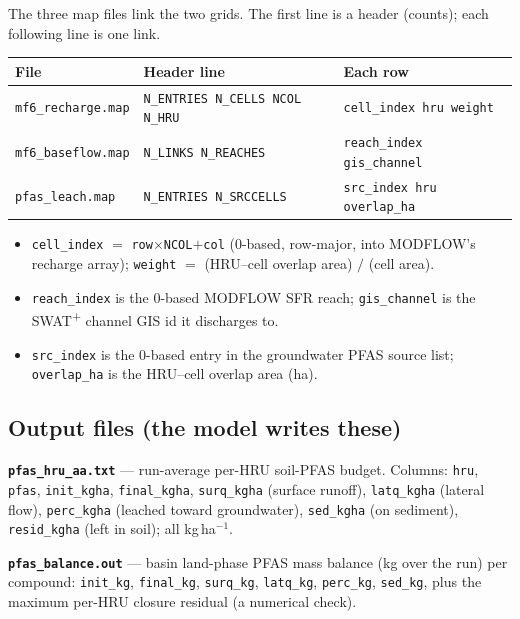 \documentclass[12pt]{article}
\begin{document}
The three map files link the two grids. The first line is a header (counts); each
following line is one link.
\begin{table}[ht]\centering\small
\begin{tabularx}{\textwidth}{lll}
\toprule
File & Header line & Each row \\ \midrule
\texttt{mf6\_recharge.map} & \texttt{N\_ENTRIES N\_CELLS NCOL N\_HRU} & \texttt{cell\_index hru weight} \\
\texttt{mf6\_baseflow.map} & \texttt{N\_LINKS N\_REACHES} & \texttt{reach\_index gis\_channel} \\
\texttt{pfas\_leach.map} & \texttt{N\_ENTRIES N\_SRCCELLS} & \texttt{src\_index hru overlap\_ha} \\
\bottomrule
\end{tabularx}
\end{table}
\begin{itemize}\itemsep1pt
  \item \texttt{cell\_index} $=$ \texttt{row}$\times$\texttt{NCOL}$+$\texttt{col}
        (0-based, row-major, into MODFLOW's recharge array); \texttt{weight} $=$
        (HRU--cell overlap area) $/$ (cell area).
  \item \texttt{reach\_index} is the 0-based MODFLOW SFR reach; \texttt{gis\_channel}
        is the SWAT\textsuperscript{+} channel GIS id it discharges to.
  \item \texttt{src\_index} is the 0-based entry in the groundwater PFAS source
        list; \texttt{overlap\_ha} is the HRU--cell overlap area (ha).
\end{itemize}

\subsection{Output files (the model writes these)}
\textbf{\texttt{pfas\_hru\_aa.txt}} --- run-average per-HRU soil-PFAS budget. Columns:
\texttt{hru}, \texttt{pfas}, \texttt{init\_kgha}, \texttt{final\_kgha},
\texttt{surq\_kgha} (surface runoff), \texttt{latq\_kgha} (lateral flow),
\texttt{perc\_kgha} (leached toward groundwater), \texttt{sed\_kgha} (on sediment),
\texttt{resid\_kgha} (left in soil); all kg\,ha$^{-1}$.

\textbf{\texttt{pfas\_balance.out}} --- basin land-phase PFAS mass balance (kg over
the run) per compound: \texttt{init\_kg}, \texttt{final\_kg}, \texttt{surq\_kg},
\texttt{latq\_kg}, \texttt{perc\_kg}, \texttt{sed\_kg}, plus the maximum per-HRU
closure residual (a numerical check).
\end{document}
